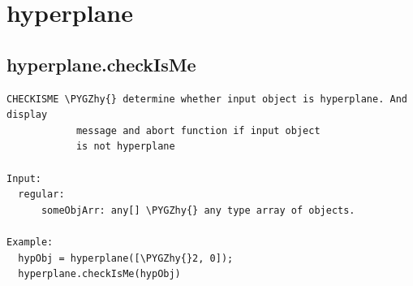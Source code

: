 \documentclass[letterpaper,10pt,english]{sphinxmanual}
\def\PYGZhy{\char`\-}
\begin{document}
\section{hyperplane}
\label{chap_functions:hyperplane}

\subsection{hyperplane.checkIsMe}
\label{chap_functions:hyperplane-checkisme}
\begin{Verbatim}[commandchars=\\\{\}]
CHECKISME \PYGZhy{} determine whether input object is hyperplane. And display
            message and abort function if input object
            is not hyperplane

Input:
  regular:
      someObjArr: any[] \PYGZhy{} any type array of objects.

Example:
  hypObj = hyperplane([\PYGZhy{}2, 0]);
  hyperplane.checkIsMe(hypObj)
\end{Verbatim}
\end{document}
